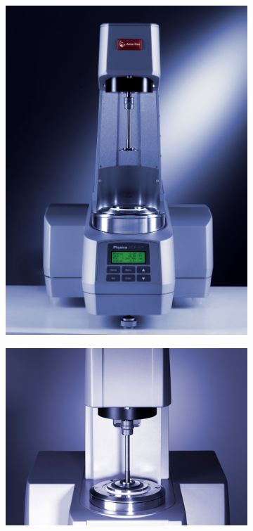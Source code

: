 \documentclass{article}
\begin{document}
\begin{figure}
   \centering
   \begin{subfigure}[b]{0.3\textwidth}
       \includegraphics[width=\textwidth]{rheometer2.jpg}
   \end{subfigure}
   \qquad %
   \begin{subfigure}[b]{0.4\textwidth}
       \includegraphics[width=\textwidth]{plosca_plosca.jpg}
   \end{subfigure}
   

\end{figure}
\end{document}

